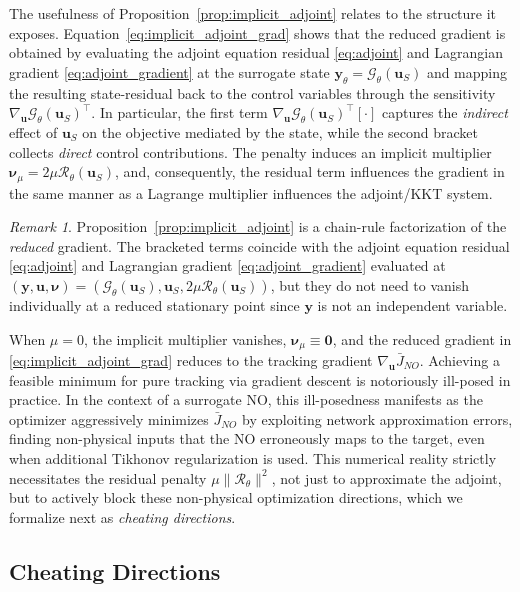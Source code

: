 \documentclass[final,1p,times]{elsarticle}
\theoremstyle{plain} %
\theoremstyle{definition} %
\theoremstyle{remark} %
\newtheorem{remark}[theorem]{Remark}
\begin{document}
The usefulness of Proposition~\ref{prop:implicit_adjoint} relates to the structure it exposes. Equation~\eqref{eq:implicit_adjoint_grad} shows that the reduced gradient is obtained by evaluating the adjoint equation residual \eqref{eq:adjoint} and Lagrangian gradient \eqref{eq:adjoint_gradient} at the surrogate state $\mathbf{y}_\theta=\mathcal{G}_\theta(\mathbf{u}_S)$ and mapping the resulting state-residual back to the control variables through the sensitivity $\nabla_{\mathbf{u}}\mathcal{G}_\theta(\mathbf{u}_S)^\top$.
In particular, the first term $\nabla_{\mathbf{u}}\mathcal{G}_\theta(\mathbf{u}_S)^\top[\cdot]$ captures the \emph{indirect} effect of $\mathbf{u}_S$ on the objective mediated by the state, while the second bracket collects \emph{direct} control contributions.
The penalty induces an implicit multiplier $\boldsymbol{\nu}_\mu=2\mu\mathcal{R}_\theta(\mathbf{u}_S)$, and, consequently, the residual term influences the gradient in the same manner as a Lagrange multiplier influences the adjoint/KKT system.
\begin{remark}
Proposition~\ref{prop:implicit_adjoint} is a chain-rule factorization of the \emph{reduced} gradient. 
The bracketed terms coincide with the adjoint equation residual \eqref{eq:adjoint} and Lagrangian gradient \eqref{eq:adjoint_gradient} evaluated at 
$(\mathbf{y},\mathbf{u},\boldsymbol{\nu})=(\mathcal{G}_\theta(\mathbf{u}_S),\mathbf{u}_S,2\mu\mathcal{R}_\theta(\mathbf{u}_S))$, 
but they do not need to vanish individually at a reduced stationary point since $\mathbf{y}$ is not an independent variable.
\end{remark}

When $\mu=0$, the implicit multiplier vanishes, $\boldsymbol{\nu}_\mu\equiv \mathbf{0}$, and the reduced gradient in
\eqref{eq:implicit_adjoint_grad} reduces to the tracking gradient $\nabla_\mathbf{u}\bar{J}_{NO}$. Achieving a feasible minimum for pure tracking via gradient descent is notoriously ill-posed in practice. In the context of a surrogate NO, this ill-posedness manifests as the optimizer aggressively minimizes $\bar{J}_{NO}$ by exploiting network approximation errors, finding non-physical inputs that the NO erroneously maps to the target, even when additional Tikhonov regularization is used. This numerical reality strictly necessitates the residual penalty $\mu\|\mathcal{R}_\theta\|^2$, not just to approximate the adjoint, but to actively block these non-physical optimization directions, which we formalize next as \textit{cheating directions}.

\subsection{Cheating Directions}\label{section3.4}
\end{document}
